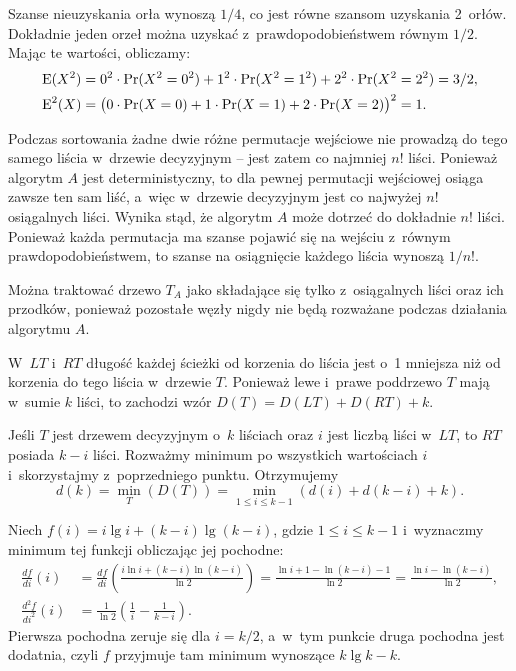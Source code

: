 \exercise %
Szanse nieuzyskania orła wynoszą $1/4$, co jest równe szansom uzyskania 2~orłów. Dokładnie jeden orzeł można uzyskać z~prawdopodobieństwem równym $1/2$. Mając te wartości, obliczamy:
\begin{align*}
	\operatorname{E}(X^2) &= 0^2\cdot\Pr(X^2=0^2)+1^2\cdot\Pr(X^2=1^2)+2^2\cdot\Pr(X^2=2^2) = 3/2, \\
	\operatorname{E}^2(X) &= \bigl(0\cdot\Pr(X=0)+1\cdot\Pr(X=1)+2\cdot\Pr(X=2)\bigr)^2 = 1.
\end{align*}

\exercise %
\exercise %

\problems


\subproblem %
Podczas sortowania żadne dwie różne permutacje wejściowe nie prowadzą do tego samego liścia w~drzewie decyzyjnym -- jest zatem co najmniej $n!$ liści. Ponieważ algorytm $A$ jest deterministyczny, to dla pewnej permutacji wejściowej osiąga zawsze ten sam liść, a~więc w~drzewie decyzyjnym jest co najwyżej $n!$ osiągalnych liści. Wynika stąd, że algorytm $A$ może dotrzeć do dokładnie $n!$ liści. Ponieważ każda permutacja ma szanse pojawić się na wejściu z~równym prawdopodobieństwem, to szanse na osiągnięcie każdego liścia wynoszą $1/n!$.

Można traktować drzewo $T_A$ jako składające się tylko z~osiągalnych liści oraz ich przodków, ponieważ pozostałe węzły nigdy nie będą rozważane podczas działania algorytmu $A$.

\subproblem %
W~$LT$ i~$RT$ długość każdej ścieżki od korzenia do liścia jest o~1 mniejsza niż od korzenia do tego liścia w~drzewie $T$. Ponieważ lewe i~prawe poddrzewo $T$ mają w~sumie $k$ liści, to zachodzi wzór $D(T)=D(LT)+D(RT)+k$.

\subproblem %
Jeśli $T$ jest drzewem decyzyjnym o~$k$ liściach oraz $i$ jest liczbą liści w~$LT$, to $RT$ posiada $k-i$ liści. Rozważmy minimum po wszystkich wartościach $i$ i~skorzystajmy z~poprzedniego punktu. Otrzymujemy
\[
	d(k) = \min_T(D(T)) = \min_{1\le i\le k-1}(d(i)+d(k-i)+k).
\]

\subproblem %
Niech $f(i)=i\lg i+(k-i)\lg(k-i)$, gdzie $1\le i\le k-1$ i~wyznaczmy minimum tej funkcji obliczając jej pochodne:
\begin{align*}
	\frac{df}{di}(i) &= \frac{df}{di}\left(\frac{i\ln i+(k-i)\ln(k-i)}{\ln2}\right) = \frac{\ln i+1-\ln(k-i)-1}{\ln2} = \frac{\ln i-\ln(k-i)}{\ln2}, \\[2mm]
	\frac{d^2\!f}{di^2}(i) &= \frac{1}{\ln2}\left(\frac{1}{i}-\frac{1}{k-i}\right).
\end{align*}
Pierwsza pochodna zeruje się dla $i=k/2$, a~w~tym punkcie druga pochodna jest dodatnia, czyli $f$ przyjmuje tam minimum wynoszące $k\lg k-k$.

